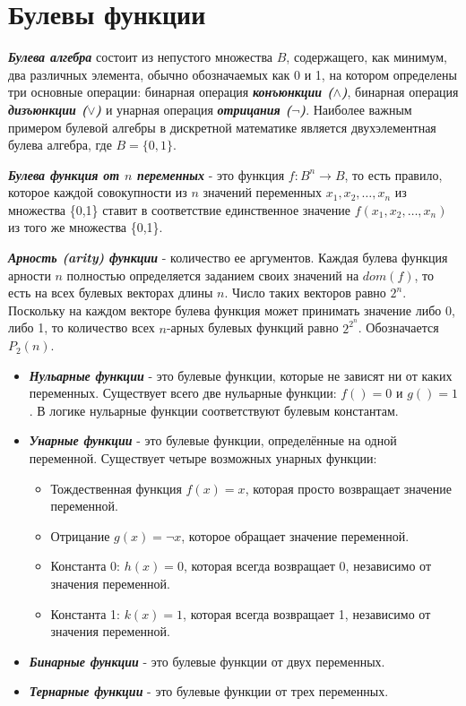 \documentclass[12pt,letterpaper]{article}
\begin{document}
\section{Булевы функции}

\textbf{\emph{Булева алгебра}} состоит из непустого множества \(B\), содержащего, как минимум, два различных элемента, обычно обозначаемых как 0 и 1, на котором определены три основные операции: бинарная операция \textbf{\emph{конъюнкции (\(\wedge\))}}, бинарная операция \textbf{\emph{дизъюнкции (\(\vee\))}} и унарная операция \textbf{\emph{отрицания (\(\neg\))}}. Наиболее важным примером булевой алгебры в дискретной математике является двухэлементная булева алгебра, где \(B = \{0, 1\}\).

\textbf{\emph{Булева функция от \(n\) переменных}} - это функция \(f : B ^ n \rightarrow B\), то есть правило, которое каждой совокупности из \(n\) значений переменных \(x_1, x_2, \ldots, x_n\)  из множества \{0,1\} ставит в соответствие единственное значение \(f(x_1, x_2, \ldots, x_n)\) из того же множества \{0,1\}.

\textbf{\emph{Арность (arity) функции}} - количество ее аргументов. Каждая булева функция арности \(n\) полностью определяется заданием своих значений на \(dom(f)\), то есть на всех булевых векторах длины \(n\). Число таких векторов равно \(2 ^ n\). Поскольку на каждом векторе булева функция может принимать значение либо 0, либо 1, то количество всех \(n\)-арных булевых функций равно \(2 ^ {2 ^ n}\). Обозначается \(P_2 (n)\).

\begin{itemize}
  \item \textbf{\emph{Нульарные функции}} - это булевые функции, которые не зависят ни от каких переменных. Существует всего две нульарные функции: \(f() = 0\) и \(g() = 1\). В логике нульарные функции соответствуют булевым константам.
  \item \textbf{\emph{Унарные функции}} - это булевые функции, определённые на одной переменной. Существует четыре возможных унарных функции:
  \begin{itemize}
    \item Тождественная функция \(f(x) = x\), которая просто возвращает значение переменной.
    \item Отрицание \(g(x) = \neg x\), которое обращает значение переменной.
    \item Константа 0: \(h(x) = 0\), которая всегда возвращает 0, независимо от значения переменной.
    \item Константа 1: \(k(x) = 1\), которая всегда возвращает 1, независимо от значения переменной.
  \end{itemize}
  \item \textbf{\emph{Бинарные функции}} - это булевые функции от двух переменных.
  \item \textbf{\emph{Тернарные функции}} - это булевые функции от трех переменных.
\end{itemize}
\end{document}
